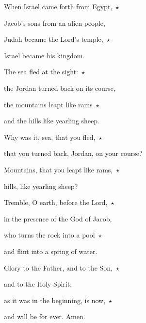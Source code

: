 \noindent When Israel came forth from Egypt,~$\star$~

Jacob’s sons from an alien people,

\noindent Judah became the Lord’s temple,~$\star$~

Israel became his kingdom.

\noindent The sea fled at the sight:~$\star$~

the Jordan turned back on its course,

\noindent the mountains leapt like rams~$\star$~

and the hills like yearling sheep.

\noindent Why was it, sea, that you fled,~$\star$~

that you turned back, Jordan, on your course?

\noindent Mountains, that you leapt like rams,~$\star$~

hills, like yearling sheep?

\noindent Tremble, O earth, before the Lord,~$\star$~

in the presence of the God of Jacob,

\noindent who turns the rock into a pool~$\star$~

and flint into a spring of water.

\noindent Glory to the Father, and to the Son,~$\star$~

and to the Holy Spirit:

\noindent as it was in the beginning, is now,~$\star$~

and will be for ever. Amen.
